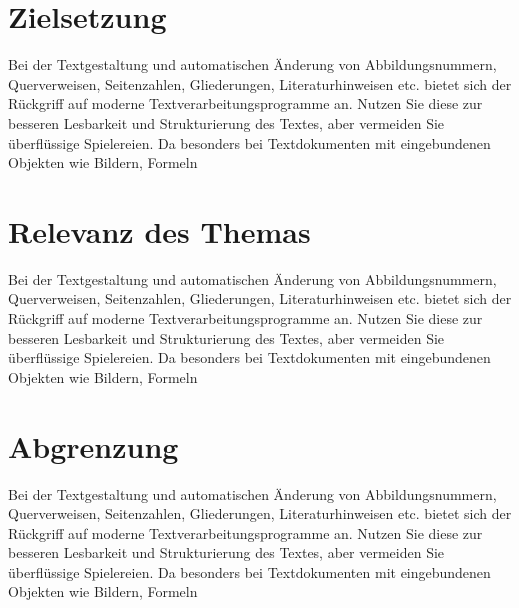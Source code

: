 \section{Zielsetzung}
Bei der Textgestaltung und automatischen Änderung von Abbildungsnummern, Querverweisen,
Seitenzahlen, Gliederungen, Literaturhinweisen etc. bietet sich der Rückgriff
auf moderne Textverarbeitungsprogramme an. Nutzen Sie diese zur besseren Lesbarkeit
und Strukturierung des Textes, aber vermeiden Sie überflüssige Spielereien. Da
besonders bei Textdokumenten mit eingebundenen Objekten wie Bildern, Formeln

\section{Relevanz des Themas}
Bei der Textgestaltung und automatischen Änderung von Abbildungsnummern, Querverweisen,
Seitenzahlen, Gliederungen, Literaturhinweisen etc. bietet sich der Rückgriff
auf moderne Textverarbeitungsprogramme an. Nutzen Sie diese zur besseren Lesbarkeit
und Strukturierung des Textes, aber vermeiden Sie überflüssige Spielereien. Da
besonders bei Textdokumenten mit eingebundenen Objekten wie Bildern, Formeln

\section{Abgrenzung}
Bei der Textgestaltung und automatischen Änderung von Abbildungsnummern, Querverweisen,
Seitenzahlen, Gliederungen, Literaturhinweisen etc. bietet sich der Rückgriff
auf moderne Textverarbeitungsprogramme an. Nutzen Sie diese zur besseren Lesbarkeit
und Strukturierung des Textes, aber vermeiden Sie überflüssige Spielereien. Da
besonders bei Textdokumenten mit eingebundenen Objekten wie Bildern, Formeln
